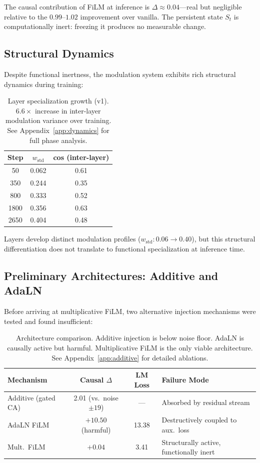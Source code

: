 \documentclass[11pt,a4paper]{article}
\newcommand{\St}{S_t}
\begin{document}
The causal contribution of FiLM at inference is $\Delta \approx 0.04$---real but
negligible relative to the $0.99$--$1.02$ improvement over vanilla. The persistent
state $\St$ is computationally inert: freezing it produces no measurable change.

\subsection{Structural Dynamics}

Despite functional inertness, the modulation system exhibits rich structural
dynamics during training:

\begin{table}[h]
\centering
\begin{tabular}{ccc}
\toprule
\textbf{Step} & $w_\mathrm{std}$ & \textbf{cos (inter-layer)} \\
\midrule
   50 & 0.062 & 0.61 \\
  350 & 0.244 & 0.35 \\
  800 & 0.333 & 0.52 \\
 1800 & 0.356 & 0.63 \\
 2650 & 0.404 & 0.48 \\
\bottomrule
\end{tabular}
\caption{Layer specialization growth (v1). $6.6\times$ increase in inter-layer
modulation variance over training. See Appendix~\ref{app:dynamics} for full
phase analysis.}
\end{table}

Layers develop distinct modulation profiles ($w_\mathrm{std}: 0.06 \to 0.40$),
but this structural differentiation does not translate to functional specialization
at inference time.

\subsection{Preliminary Architectures: Additive and AdaLN}
\label{sec:additive}

Before arriving at multiplicative FiLM, two alternative injection mechanisms were
tested and found insufficient:

\begin{table}[h]
\centering
\begin{tabular}{lccp{5.5cm}}
\toprule
\textbf{Mechanism} & \textbf{Causal} $\Delta$ & \textbf{LM Loss} & \textbf{Failure Mode} \\
\midrule
Additive (gated CA) & 2.01 (vs.\ noise $\pm 19$) & --- & Absorbed by residual stream \\
AdaLN FiLM          & $+10.50$ (harmful) & 13.38 & Destructively coupled to aux.\ loss \\
Mult.\ FiLM         & $+0.04$ & 3.41 & Structurally active, functionally inert \\
\bottomrule
\end{tabular}
\caption{Architecture comparison. Additive injection is below noise floor. AdaLN
is causally active but harmful. Multiplicative FiLM is the only viable architecture.
See Appendix~\ref{app:additive} for detailed ablations.}
\end{table}
\end{document}
